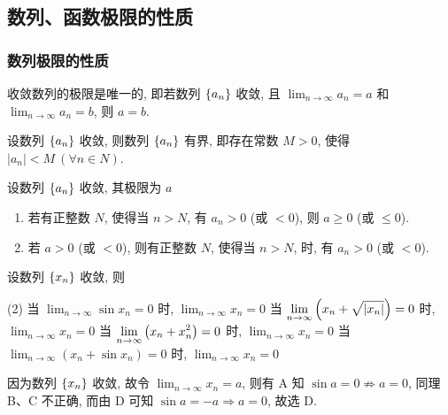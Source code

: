 \subsection{数列、函数极限的性质}

\subsubsection{数列极限的性质}

\begin{theorem}[数列极限的唯一性]
    收敛数列的极限是唯一的, 即若数列 $\qty{a_n}$ 收敛, 且 $\displaystyle\lim_{n\to\infty}a_n=a$ 和 $\displaystyle\lim_{n\to\infty}a_n=b$, 则 $a=b$.
\end{theorem}

\begin{theorem}[数列极限的有界性]
    设数列 $\qty{a_n}$ 收敛, 则数列 $\qty{a_n}$ 有界, 即存在常数 $M>0$, 使得 $|a_n|<M~(\forall n\in N)$.
\end{theorem}

\begin{theorem}[数列极限的保号性]
    设数列 $\qty{a_n}$ 收敛, 其极限为 $a$
    \begin{enumerate}[label=(\arabic{*})]
        \item 若有正整数 $N$, 使得当 $n>N$, 有 $a_n>0$ (或 $<0$), 则 $a\geqslant 0$ (或 $\leqslant 0$).
        \item 若 $a>0$ (或 $<0$), 则有正整数 $N$, 使得当 $n>N$, 时, 有 $a_n>0$ (或 $<0$).
    \end{enumerate}
\end{theorem}

\begin{example}[2017 数二]
    设数列 $\qty{x_n}$ 收敛, 则
    \begin{tasks}(2)
        \task 当 $\displaystyle\lim_{n\to\infty}\sin x_n=0$ 时, $\displaystyle\lim_{n\to\infty}x_n=0$
        \task 当 $\displaystyle\lim_{n\to\infty}\qty(x_n+\sqrt{|x_n|})=0$ 时, $\displaystyle\lim_{n\to\infty}x_n=0$
        \task 当 $\displaystyle\lim_{n\to\infty}\qty(x_n+x_n^2)=0$ 时, $\displaystyle\lim_{n\to\infty}x_n=0$
        \task 当 $\displaystyle\lim_{n\to\infty}(x_n+\sin x_n)=0$ 时, $\displaystyle\lim_{n\to\infty}x_n=0$
    \end{tasks}
\end{example}
\begin{solution}
    因为数列 $\qty{x_n}$ 收敛, 故令 $\displaystyle\lim_{n\to\infty}x_n=a$, 则有 A 知 $\sin a=0\not\Rightarrow a=0$, 同理 B、C 不正确, 而由 D 可知 $\sin a=-a\Rightarrow a=0$, 故选 D.
\end{solution}

